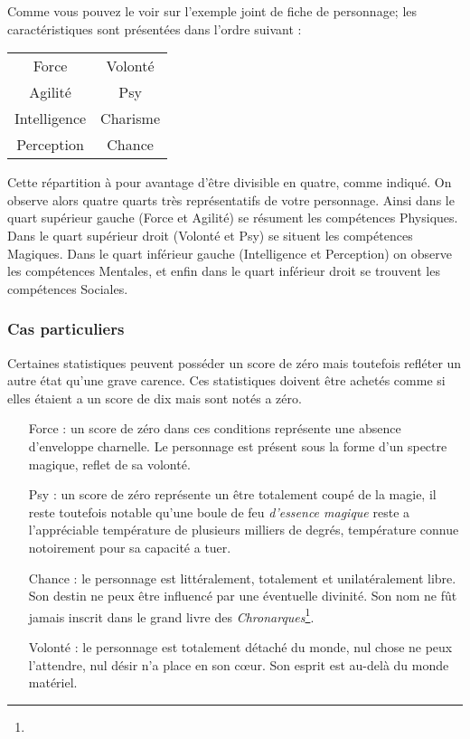 Comme vous pouvez le voir sur l’exemple joint de fiche de personnage; 
les caractéristiques sont présentées dans l’ordre suivant :

\begin{tabular}{c|c}
    Force &Volonté \\
    Agilité & Psy \\
    \hline
    Intelligence & Charisme\\
    Perception & Chance
\end{tabular}


Cette répartition à pour avantage d’être divisible en quatre, comme indiqué. On observe alors quatre quarts très représentatifs de votre personnage. Ainsi dans le quart supérieur gauche (Force et Agilité) se résument les compétences Physiques. 
Dans le quart supérieur droit (Volonté et Psy) se situent les compétences Magiques. Dans le quart inférieur gauche (Intelligence et Perception) on observe les compétences Mentales, 
et enfin dans le quart inférieur droit se trouvent les compétences Sociales.

\subsubsection{Cas particuliers}
Certaines statistiques peuvent posséder un score de zéro mais toutefois refléter un autre état qu'une grave carence.
Ces statistiques doivent être achetés comme si elles étaient a un score de dix mais sont notés a zéro.
\begin{itemize}
    \item[Force :] un score de zéro dans ces conditions représente une absence d'enveloppe charnelle. Le personnage est présent sous la forme d'un spectre magique, reflet de sa volonté.
    \item[Psy :] un score de zéro représente un être totalement coupé de la magie, il reste toutefois notable qu'une boule de feu {\em d'essence magique} reste a l'appréciable température de plusieurs milliers de degrés, température connue notoirement pour sa capacité a tuer. 
    \item[Chance :] le personnage est littéralement, totalement et unilatéralement libre. Son destin ne peux être influencé par une éventuelle divinité. Son nom ne fût jamais inscrit dans le grand livre des {\em Chronarques}\footnote{}.
    \item[Volonté :] le personnage est totalement détaché du monde, nul chose ne peux l'attendre, nul désir n'a place en son cœur. Son esprit est au-delà du monde matériel.
\end{itemize}
